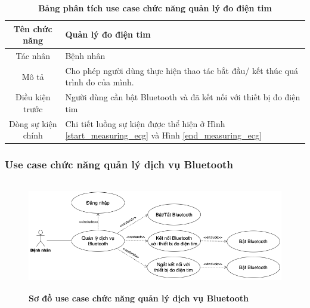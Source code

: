   \begin{table}[H]
    \caption{\bfseries \fontsize{12pt}{0pt}\selectfont Bảng phân tích use case chức năng quản lý đo điện tim}
    \centering
    \begin{tabularx}{0.9\textwidth}{|c|X|}
      \hline
      \textbf{Tên chức năng} & \textbf{Quản lý đo điện tim} \\
      \hline
      Tác nhân & Bệnh nhân \\
      \hline
      Mô tả & Cho phép người dùng thực hiện thao tác bắt đầu/ kết thúc quá trình đo của mình. \\
      \hline
      Điều kiện trước & Người dùng cần bật Bluetooth và đã kết nối với thiết bị đo điện tim \\
      \hline
      Dòng sự kiện chính & 
        Chi tiết luồng sự kiện được thể hiện ở Hình \ref{start_measuring_ecg} và Hình \ref{end_measuring_ecg} \\
      \hline
    \end{tabularx}
  \end{table}

\subsubsection{Use case chức năng quản lý dịch vụ Bluetooth}
  \begin{figure}[H]
    \centering
    \includegraphics[width=12cm,height=4.8cm]{Images/use_case/use_case_bluetooth.png}
    \caption[Sơ đồ use case chức năng quản lý dịch vụ Bluetooth]{\bfseries \fontsize{12pt}{0pt}
    \selectfont Sơ đồ use case chức năng quản lý dịch vụ Bluetooth}
    \label{use_case_bluetooth} %
  \end{figure}

